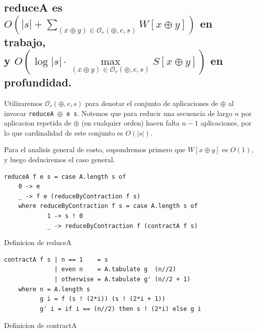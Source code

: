\documentclass[12pt]{article}
\begin{document}
\subsection{reduceA es $O(|s| + \sum\limits_{(x\oplus y)\in\mathcal{O}_r(\oplus,e,s)} W[x\oplus y])$ en trabajo,\\
y $ O(\log |s|\cdot \max\limits_{(x\oplus y)\in\mathcal{O}_r(\oplus,e,s)} S[x\oplus y])$ en profundidad.}

Utilizaremos $\mathcal{O}_r(\oplus,e,s)$ para denotar el conjunto de aplicaciones de $\oplus$ al invocar \texttt{reduceA $\oplus$ e s}. Notemos que para reducir una secuencia de largo $n$ por aplicacion repetida de $\oplus$ (en cualquier orden) hacen falta $n-1$ aplicaciones, por lo que cardinalidad de este conjunto es $O(|s|)$.

Para el analisis general de costo, supondremos primero que $W[x \oplus y]$ es $O(1)$, y luego deduciremos el caso general.

\begin{table}[h!]
\begin{lstlisting}
reduceA f e s = case A.length s of
    0 -> e
    _ -> f e (reduceByContraction f s)
    where reduceByContraction f s = case A.length s of
            1 -> s ! 0
            _ -> reduceByContraction f (contractA f s)
\end{lstlisting}
\caption{Definicion de reduceA}
\end{table}

\begin{table}[h!]
\begin{lstlisting}
contractA f s | n == 1    = s
              | even n    = A.tabulate g  (n//2)
              | otherwise = A.tabulate g' (n//2 + 1)
    where n = A.length s
          g i = f (s ! (2*i)) (s ! (2*i + 1))
          g' i = if i == (n//2) then s ! (2*i) else g i
\end{lstlisting}
\caption{Definicion de contractA}
\end{table}
\end{document}
